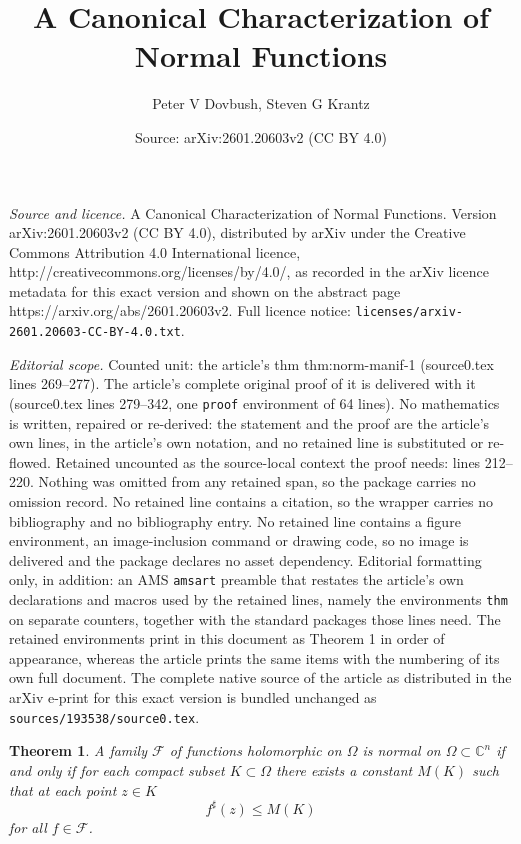\documentclass[10pt,a4paper]{amsart}
\title{A Canonical Characterization of Normal Functions}
\author{Peter V Dovbush, Steven G Krantz}
\date{Source: arXiv:2601.20603v2 (CC BY 4.0)}
\newtheorem{thm}{Theorem}
\newcommand{\Cn}{\mathbb{C}^n}
\begin{document}
\maketitle

\noindent\emph{Source and licence.} A Canonical Characterization of Normal Functions. Version arXiv:2601.20603v2 (CC BY 4.0), distributed by arXiv under the Creative Commons Attribution 4.0 International licence, http://creativecommons.org/licenses/by/4.0/, as recorded in the arXiv licence metadata for this exact version and shown on the abstract page https://arxiv.org/abs/2601.20603v2. Full licence notice: \texttt{licenses/arxiv-2601.20603-CC-BY-4.0.txt}.\par\smallskip

\noindent\textit{Editorial scope.} Counted unit: the article's thm thm:norm-manif-1 (source0.tex lines 269--277). The article's complete original proof of it is delivered with it (source0.tex lines 279--342, one \texttt{proof} environment of 64 lines). No mathematics is written, repaired or re-derived: the statement and the proof are the article's own lines, in the article's own notation, and no retained line is substituted or re-flowed.  Retained uncounted as the source-local context the proof needs: lines 212--220.  Nothing was omitted from any retained span, so the package carries no omission record.  No retained line contains a citation, so the wrapper carries no bibliography and no bibliography entry.  No retained line contains a figure environment, an image-inclusion command or drawing code, so no image is delivered and the package declares no asset dependency.  Editorial formatting only, in addition: an AMS \texttt{amsart} preamble that restates the article's own declarations and macros used by the retained lines, namely the environments \texttt{thm} on separate counters, together with the standard packages those lines need.  The retained environments print in this document as Theorem 1 in order of appearance, whereas the article prints the same items with the numbering of its own full document.  The complete native source of the article as distributed in the arXiv e-print for this exact version is bundled unchanged as \texttt{sources/193538/source0.tex}.
    \begin{thm}
        \label{thm:marty:1}
        A family $\mathcal{F}$ of functions holomorphic on $\Omega$ is normal on $\Omega\subset \Cn$ if and only if for each compact subset $K\subset \Omega$ there exists a constant $M(K)$ such that at each point $z\in K$
        \begin{equation}
            f^\sharp(z)\leq M(K)
            \label{eq:marty:1}
        \end{equation}
        for all $f\in \mathcal{F}$.
    \end{thm}
\end{document}
